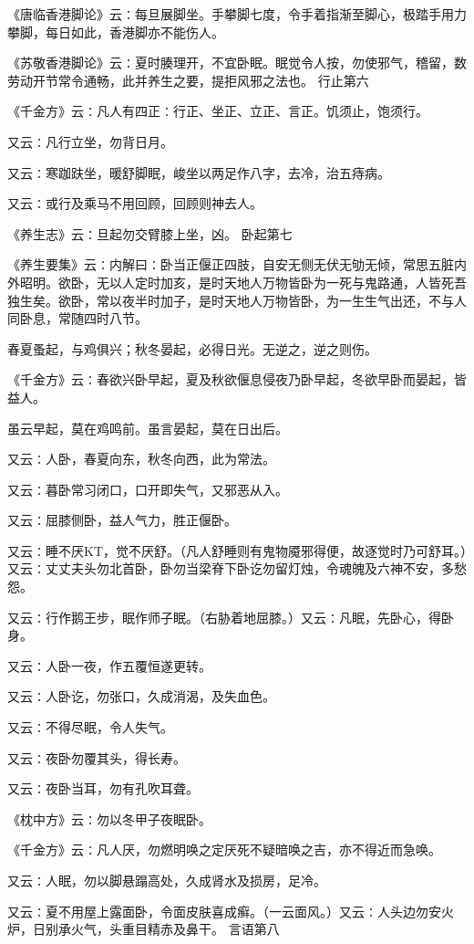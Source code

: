 \documentclass[a4paper,12pt,UTF8,twoside]{ctexbook}
\begin{document}
《唐临香港脚论》云∶每旦展脚坐。手攀脚七度，令手着指渐至脚心，极踏手用力攀脚，每日如此，香港脚亦不能伤人。

《苏敬香港脚论》云∶夏时腠理开，不宜卧眠。眠觉令人按，勿使邪气，稽留，数劳动开节常令通畅，此并养生之要，提拒风邪之法也。
行止第六

《千金方》云∶凡人有四正∶行正、坐正、立正、言正。饥须止，饱须行。

又云∶凡行立坐，勿背日月。

又云∶寒跏趺坐，暖舒脚眠，峻坐以两足作八字，去冷，治五痔病。

又云∶或行及乘马不用回顾，回顾则神去人。

《养生志》云∶旦起勿交臂膝上坐，凶。
卧起第七

《养生要集》云∶内解曰∶卧当正偃正四肢，自安无侧无伏无劬无倾，常思五脏内外昭明。欲卧，无以人定时加亥，是时天地人万物皆卧为一死与鬼路通，人皆死吾独生矣。欲卧，常以夜半时加子，是时天地人万物皆卧，为一生生气出还，不与人同卧息，常随四时八节。

春夏蚤起，与鸡俱兴；秋冬晏起，必得日光。无逆之，逆之则伤。

《千金方》云∶春欲兴卧早起，夏及秋欲偃息侵夜乃卧早起，冬欲早卧而晏起，皆益人。

虽云早起，莫在鸡鸣前。虽言晏起，莫在日出后。

又云∶人卧，春夏向东，秋冬向西，此为常法。

又云∶暮卧常习闭口，口开即失气，又邪恶从入。

又云∶屈膝侧卧，益人气力，胜正偃卧。

又云∶睡不厌KT，觉不厌舒。（凡人舒睡则有鬼物魇邪得便，故逐觉时乃可舒耳。）又云∶丈丈夫头勿北首卧，卧勿当梁脊下卧讫勿留灯烛，令魂魄及六神不安，多愁怨。

又云∶行作鹅王步，眠作师子眠。（右胁着地屈膝。）又云∶凡眠，先卧心，得卧身。

又云∶人卧一夜，作五覆恒遂更转。

又云∶人卧讫，勿张口，久成消渴，及失血色。

又云∶不得尽眠，令人失气。

又云∶夜卧勿覆其头，得长寿。

又云∶夜卧当耳，勿有孔吹耳聋。

《枕中方》云∶勿以冬甲子夜眠卧。

《千金方》云∶凡人厌，勿燃明唤之定厌死不疑暗唤之吉，亦不得近而急唤。

又云∶人眠，勿以脚悬蹋高处，久成肾水及损房，足冷。

又云∶夏不用屋上露面卧，令面皮肤喜成癣。（一云面风。）又云∶人头边勿安火炉，日别承火气，头重目精赤及鼻干。
言语第八
\end{document}

